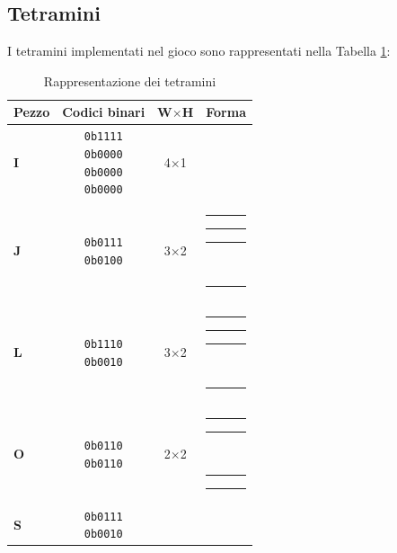 \documentclass[a4paper, 12pt]{article}
\newcommand{\RedBlock}{\colorbox{red}{\rule{1.2ex}{1.2ex}}}      %
\newcommand{\WhiteBlock}{\fcolorbox{black}{white}{\rule{1.2ex}{1.2ex}}} %
\begin{document}
\subsection{Tetramini}
\label{subsec:tetramini}
I tetramini implementati nel gioco sono rappresentati nella Tabella \ref{tab:tetramini}:

\begin{table}[H]
    \centering
    \caption{Rappresentazione dei tetramini}
    \label{tab:tetramini}
    \begin{tabular}{
            >{\bfseries}l   %
            c               %
            c               %
            l               %
        }
        \toprule
        Pezzo & Codici binari                                      & W\(\times\)H & Forma \\
        \midrule
        I     & \makecell{\texttt{0b1111}                                                 \\\texttt{0b0000}\\\texttt{0b0000}\\\texttt{0b0000}}
              & 4\(\times\)1
              & \makecell{\RedBlock\RedBlock\RedBlock\RedBlock}                           \\
        \addlinespace
        J     & \makecell{\texttt{0b0111}                                                 \\\texttt{0b0100}}
              & 3\(\times\)2
              & \makecell{\WhiteBlock\RedBlock\RedBlock\RedBlock                          \\\WhiteBlock\RedBlock\WhiteBlock\WhiteBlock} \\
        \addlinespace
        L     & \makecell{\texttt{0b1110}                                                 \\\texttt{0b0010}}
              & 3\(\times\)2
              & \makecell{\RedBlock\RedBlock\RedBlock\WhiteBlock                          \\\WhiteBlock\RedBlock\WhiteBlock\WhiteBlock} \\
        \addlinespace
        O     & \makecell{\texttt{0b0110}                                                 \\\texttt{0b0110}}
              & 2\(\times\)2
              & \makecell{\WhiteBlock\RedBlock\RedBlock\WhiteBlock                        \\\WhiteBlock\RedBlock\RedBlock\WhiteBlock} \\
        \addlinespace
        S     & \makecell{\texttt{0b0111}                                                 \\\texttt{0b0010}}

\end{tabular}
\end{table}
\end{document}
